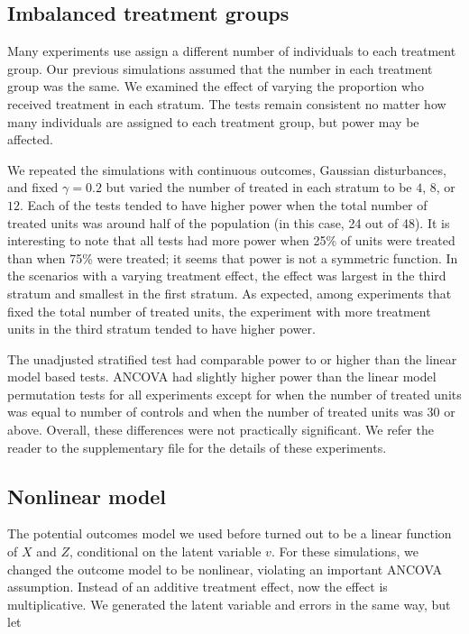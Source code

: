 \documentclass[12pt]{article}
\begin{document}
\subsection{Imbalanced treatment groups}
Many experiments use assign a different number of individuals to each treatment group.
Our previous simulations assumed that the number in each treatment group was the same.
We examined the effect of varying the proportion who received treatment in each stratum.
The tests remain consistent no matter how many individuals are assigned to each treatment group, 
but power may be affected.

We repeated the simulations with continuous outcomes, Gaussian disturbances, and fixed $\gamma=0.2$ but varied the number of treated in each stratum to be $4$, $8$, or $12$.
Each of the tests tended to have higher power when the total number of treated units was around half of the population (in this case, 24 out of 48).
It is interesting to note that all tests had more power when 25\% of units were treated than when 75\% were treated; it seems that power is not a symmetric function.
In the scenarios with a varying treatment effect, the  effect was largest in the third stratum and smallest in the first stratum.
As expected, among experiments that fixed the total number of treated units, the experiment with more treatment units in the third stratum tended to have higher power.

The unadjusted stratified test had comparable power to or higher than the linear model based tests.
ANCOVA had slightly higher power than the linear model permutation tests for all experiments except for when the number of treated units was equal to number of controls and when the number of treated units was 30 or above.
Overall, these differences were not practically significant.
We refer the reader to the supplementary file for the details of these experiments.



\subsection{Nonlinear model}

The potential outcomes model we used before turned out to be a linear function of $X$ and $Z$, conditional on the latent variable $v$.
For these simulations, we changed the outcome model to be nonlinear, violating an important ANCOVA assumption.
Instead of an additive treatment effect, now the effect is multiplicative.
We generated the latent variable and errors in the same way, but let 
\end{document}
